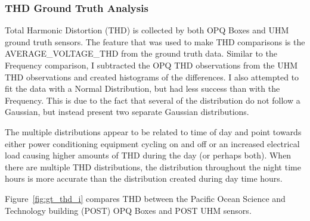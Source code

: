 \subsubsection{THD Ground Truth Analysis}

Total Harmonic Distortion (THD) is collected by both OPQ Boxes and UHM ground truth sensors. The feature that was used to make THD comparisons is the AVERAGE\_VOLTAGE\_THD from the ground truth data. Similar to the Frequency comparison, I subtracted the OPQ THD observations from the UHM THD observations and created histograms of the differences. I also attempted to fit the data with a Normal Distribution, but had less success than with the Frequency. This is due to the fact that several of the distribution do not follow a Gaussian, but instead present two separate Gaussian distributions.

The multiple distributions appear to be related to time of day and point towards either power conditioning equipment cycling on and off or an increased electrical load causing higher amounts of THD during the day (or perhaps both). When there are multiple THD distributions, the distribution throughout the night time hours is more accurate than the distribution created during day time hours.

Figure~\ref{fig:gt_thd_i} compares THD between the Pacific Ocean Science and Technology building (POST) OPQ Boxes and POST UHM sensors.

